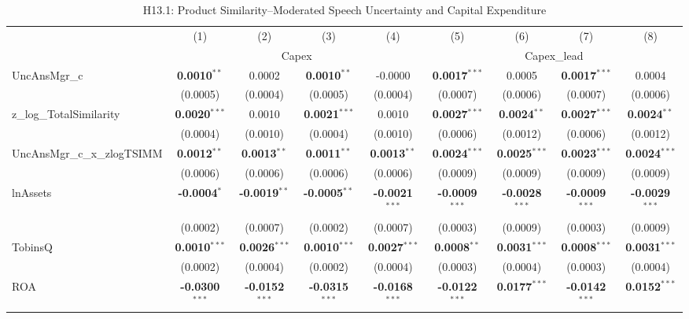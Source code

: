 \documentclass[11pt,a4paper]{article}
\begin{document}
\begin{table}[htbp]
\centering
\caption{H13.1: Product Similarity--Moderated Speech Uncertainty and Capital Expenditure}
\label{tab:h13_1}
\scriptsize
\begin{tabular}{lcccccccc}
\toprule
 & (1) & (2) & (3) & (4) & (5) & (6) & (7) & (8) \\
 & \multicolumn{4}{c}{Capex} & \multicolumn{4}{c}{Capex\_lead} \\
\cmidrule(lr){2-5} \cmidrule(lr){6-9}
\midrule
UncAnsMgr\_c & \textbf{0.0010}$^{**}$ & 0.0002 & \textbf{0.0010}$^{**}$ & -0.0000 & \textbf{0.0017}$^{***}$ & 0.0005 & \textbf{0.0017}$^{***}$ & 0.0004 \\
 & (0.0005) & (0.0004) & (0.0005) & (0.0004) & (0.0007) & (0.0006) & (0.0007) & (0.0006) \\
z\_log\_TotalSimilarity & \textbf{0.0020}$^{***}$ & 0.0010 & \textbf{0.0021}$^{***}$ & 0.0010 & \textbf{0.0027}$^{***}$ & \textbf{0.0024}$^{**}$ & \textbf{0.0027}$^{***}$ & \textbf{0.0024}$^{**}$ \\
 & (0.0004) & (0.0010) & (0.0004) & (0.0010) & (0.0006) & (0.0012) & (0.0006) & (0.0012) \\
UncAnsMgr\_c\_x\_zlogTSIMM & \textbf{0.0012}$^{**}$ & \textbf{0.0013}$^{**}$ & \textbf{0.0011}$^{**}$ & \textbf{0.0013}$^{**}$ & \textbf{0.0024}$^{***}$ & \textbf{0.0025}$^{***}$ & \textbf{0.0023}$^{***}$ & \textbf{0.0024}$^{***}$ \\
 & (0.0006) & (0.0006) & (0.0006) & (0.0006) & (0.0009) & (0.0009) & (0.0009) & (0.0009) \\
\midrule
lnAssets & \textbf{-0.0004}$^{*}$ & \textbf{-0.0019}$^{**}$ & \textbf{-0.0005}$^{**}$ & \textbf{-0.0021}$^{***}$ & \textbf{-0.0009}$^{***}$ & \textbf{-0.0028}$^{***}$ & \textbf{-0.0009}$^{***}$ & \textbf{-0.0029}$^{***}$ \\
 & (0.0002) & (0.0007) & (0.0002) & (0.0007) & (0.0003) & (0.0009) & (0.0003) & (0.0009) \\
TobinsQ & \textbf{0.0010}$^{***}$ & \textbf{0.0026}$^{***}$ & \textbf{0.0010}$^{***}$ & \textbf{0.0027}$^{***}$ & \textbf{0.0008}$^{**}$ & \textbf{0.0031}$^{***}$ & \textbf{0.0008}$^{***}$ & \textbf{0.0031}$^{***}$ \\
 & (0.0002) & (0.0004) & (0.0002) & (0.0004) & (0.0003) & (0.0004) & (0.0003) & (0.0004) \\
ROA & \textbf{-0.0300}$^{***}$ & \textbf{-0.0152}$^{***}$ & \textbf{-0.0315}$^{***}$ & \textbf{-0.0168}$^{***}$ & \textbf{-0.0122}$^{***}$ & \textbf{0.0177}$^{***}$ & \textbf{-0.0142}$^{***}$ & \textbf{0.0152}$^{***}$ \\

\end{tabular}
\end{table}
\end{document}
